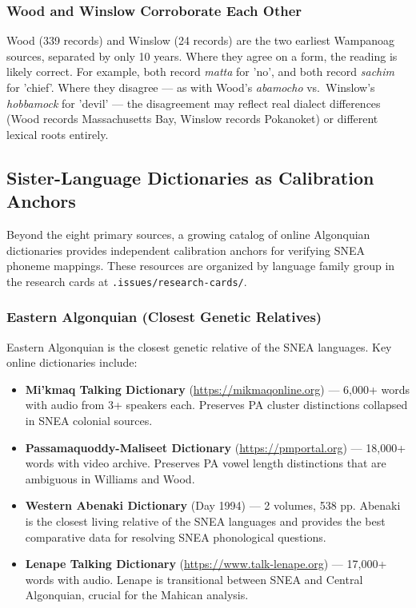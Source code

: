 \subsubsection{Wood and Winslow Corroborate Each Other}

Wood (339 records) and Winslow (24 records) are the two earliest Wampanoag
sources, separated by only 10 years. Where they agree on a form, the
reading is likely correct. For example, both record \textit{matta} for 'no',
and both record \textit{sachim} for 'chief'. Where they disagree --- as with
Wood's \textit{abamocho} vs.\ Winslow's \textit{hobbamock} for 'devil' ---
the disagreement may reflect real dialect differences (Wood records
Massachusetts Bay, Winslow records Pokanoket) or different lexical roots
entirely.


\subsection{Sister-Language Dictionaries as Calibration Anchors}

Beyond the eight primary sources, a growing catalog of online Algonquian
dictionaries provides independent calibration anchors for verifying SNEA
phoneme mappings. These resources are organized by language family group
in the research cards at \texttt{.issues/research-cards/}.

\subsubsection{Eastern Algonquian (Closest Genetic Relatives)}

Eastern Algonquian is the closest genetic relative of the SNEA languages.
Key online dictionaries include:

\begin{itemize}
  \item \textbf{Mi'kmaq Talking Dictionary} (\url{https://mikmaqonline.org})
    --- 6,000+ words with audio from 3+ speakers each. Preserves PA cluster
    distinctions collapsed in SNEA colonial sources.
  \item \textbf{Passamaquoddy-Maliseet Dictionary} (\url{https://pmportal.org})
    --- 18,000+ words with video archive. Preserves PA vowel length
    distinctions that are ambiguous in Williams and Wood.
  \item \textbf{Western Abenaki Dictionary} (Day 1994) --- 2 volumes, 538 pp.
    Abenaki is the closest living relative of the SNEA languages and provides
    the best comparative data for resolving SNEA phonological questions.
  \item \textbf{Lenape Talking Dictionary} (\url{https://www.talk-lenape.org})
    --- 17,000+ words with audio. Lenape is transitional between SNEA and
    Central Algonquian, crucial for the Mahican analysis.
\end{itemize}

